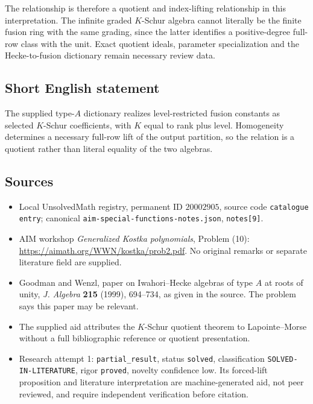 \documentclass[11pt]{article}
\begin{document}
The relationship is therefore a quotient and index-lifting relationship in this interpretation. The infinite graded $K$-Schur algebra cannot literally be the finite fusion ring with the same grading, since the latter identifies a positive-degree full-row class with the unit. Exact quotient ideals, parameter specialization and the Hecke-to-fusion dictionary remain necessary review data.
\subsection{Short English statement}
The supplied type-$A$ dictionary realizes level-restricted fusion constants as selected $K$-Schur coefficients, with $K$ equal to rank plus level. Homogeneity determines a necessary full-row lift of the output partition, so the relation is a quotient rather than literal equality of the two algebras.
\subsection{Sources}
\begin{itemize}
\item Local UnsolvedMath registry, permanent ID $20002905$, source code \texttt{catalogue entry}; canonical \texttt{aim-special-functions-notes.json}, \texttt{notes[9]}.
\item AIM workshop \emph{Generalized Kostka polynomials}, Problem (10): \url{https://aimath.org/WWN/kostka/prob2.pdf}. No original remarks or separate literature field are supplied.
\item Goodman and Wenzl, paper on Iwahori--Hecke algebras of type $A$ at roots of unity, \emph{J. Algebra} \textbf{215} (1999), 694--734, as given in the source. The problem says this paper may be relevant.
\item The supplied aid attributes the $K$-Schur quotient theorem to Lapointe--Morse without a full bibliographic reference or quotient presentation.
\item Research attempt 1: \texttt{partial\_result}, status \texttt{solved}, classification \texttt{SOLVED-IN-LITERATURE}, rigor \texttt{proved}, novelty confidence low. Its forced-lift proposition and literature interpretation are machine-generated aid, not peer reviewed, and require independent verification before citation.
\end{itemize}
\end{document}
